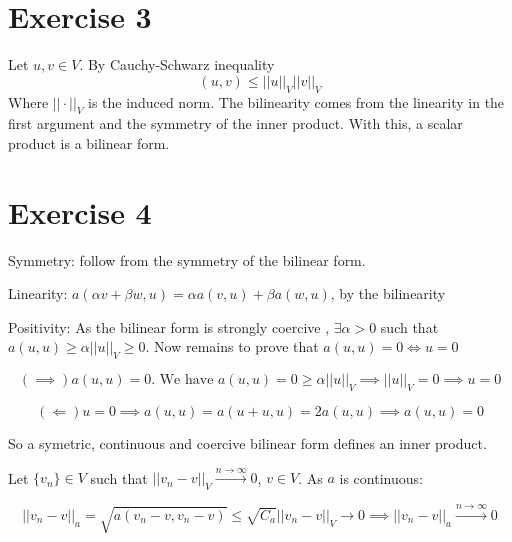 \documentclass{article}
\begin{document}
    \section*{Exercise 3}
    Let $u,v \in V$. By Cauchy-Schwarz inequality
    \[
        (u,v) \le ||u||_V ||v||_V
    \]
    Where $||\cdot||_V$ is the induced norm. The bilinearity comes from the linearity in the first argument and the symmetry of the inner product. With this, a scalar product is a bilinear form.

    \section*{Exercise 4}
    Symmetry: follow from the symmetry of the bilinear form.

    Linearity: $a(\alpha v + \beta w, u) = \alpha a(v,u) + \beta a(w,u)$, by the bilinearity

    Positivity: As the bilinear form is strongly coercive , $\exists \alpha > 0$ such that $a(u,u) \ge \alpha ||u||_V \ge 0$.
    Now remains to prove that $a(u,u) = 0 \iff u = 0$

    \[
        (\implies) a(u,u) = 0 \text{. We have } a(u,u) = 0 \ge \alpha ||u||_V \implies ||u||_V = 0 \implies u = 0 
    \]

    \[
        (\Longleftarrow) u = 0 \implies a(u,u) = a(u + u, u) = 2a(u,u) \implies a(u,u) = 0
    \]

    So a symetric, continuous and coercive bilinear form defines an inner product.

    Let $\{v_n\} \in V$ such that $||v_n - v||_V \overset{n \to \infty}{\longrightarrow} 0$, $v \in V$. As $a$ is continuous:

    \[
        ||v_n -v||_a = \sqrt{a(v_n -v, v_n - v)} \le \sqrt{C_a}||v_n - v||_V \to 0 \implies ||v_n - v||_a \overset{n \to \infty}{\longrightarrow} 0
    \]
\end{document}
